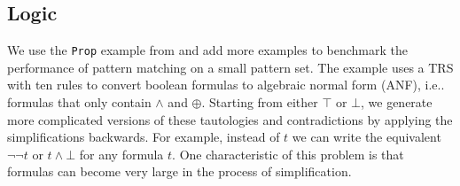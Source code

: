 \documentclass[conference,compsoc]{IEEEtran}
\makeatletter
\DeclareRobustCommand\onedot{\futurelet\@let@token\@onedot}
\def\@onedot{\ifx\@let@token.\else.\null\fi\xspace}
\def\ie{{i.e}\onedot} \def\Ie{{I.e}\onedot}
\makeatother
\begin{document}

\subsection{Logic}

We use the \texttt{Prop} example from \cite{Kirchner2001} and add more examples to benchmark the performance of pattern matching on a small pattern set.
The example uses a TRS with ten rules to convert boolean formulas to algebraic normal form (ANF), \ie formulas that only contain $\wedge$ and $\oplus$.
Starting from either $\top$ or $\bot$, we generate more complicated versions of these tautologies and contradictions by applying the simplifications backwards.
For example, instead of $t$ we can write the equivalent $\neg \neg t$ or $t \wedge \bot$ for any formula $t$.
One characteristic of this problem is that formulas can become very large in the process of simplification.
\end{document}
